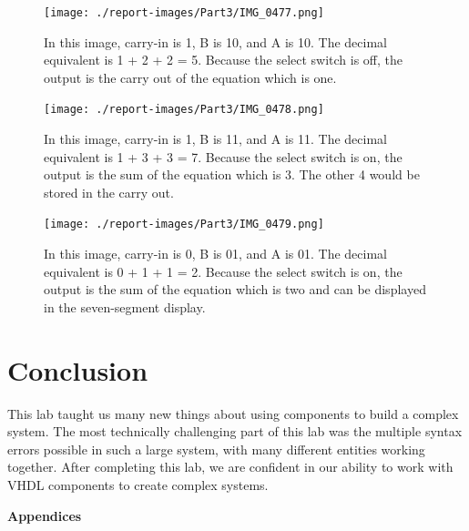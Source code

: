 \documentclass[11pt]{article}
\begin{document}
\begin{figure}[H]
\begin{center}
	\texttt{[image: ./report-images/Part3/IMG\_0477.png]}
	\caption{\label{fig:sevSegOnePlusTwoPlusTwoCarry}In this image, carry-in is 1, B is 10, and A is 10. The decimal equivalent is 1 + 2 + 2 = 5. Because the select switch is off, the output is the carry out of the equation which is one.}
\end{center}
\end{figure}

\begin{figure}[H]
\begin{center}
	\texttt{[image: ./report-images/Part3/IMG\_0478.png]}
	\caption{\label{fig:sevSegOnePlusThreePlusThreeSUM}In this image, carry-in is 1, B is 11, and A is 11. The decimal equivalent is 1 + 3 + 3 = 7. Because the select switch is on, the output is the sum of the equation which is 3. The other 4 would be stored in the carry out.}
\end{center}
\end{figure}

\begin{figure}[H]
\begin{center}
	\texttt{[image: ./report-images/Part3/IMG\_0479.png]}
	\caption{\label{fig:sevSegOnePlusOneSUM}In this image, carry-in is 0, B is 01, and A is 01. The decimal equivalent is 0 + 1 + 1 = 2. Because the select switch is on, the output is the sum of the equation which is two and can be displayed in the seven-segment display.}
\end{center}
\end{figure}

\section{Conclusion}
This lab taught us many new things about using components to build a complex system. The most technically challenging part of this lab was the multiple syntax errors possible in such a large system, with many different entities working together. After completing this lab, we are confident in our ability to work with VHDL components to create complex systems.

\pagebreak

\textbf{Appendices}
\end{document}
